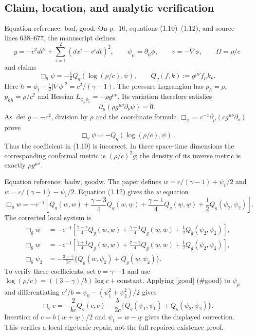 \documentclass[10pt]{article}
\begin{document}
\subsection*{Claim, location, and analytic verification}
Equation reference: bad, good. On p. 10, equations (1.10)–(1.12), and source lines 638–677, the manuscript defines \[g=-c^2dt^2+\sum_{i=1}^2(dx^i-v^idt)^2,\qquad
\psi_\mu=\partial_\mu\phi,\qquad v=-\nabla\phi,\qquad \Omega=\rho/c\] and claims \[
\Box_g\psi=-\tfrac12Q_g(\log(\rho/c),\psi),\qquad
Q_g(f,k):=g^{\mu\nu}f_\mu k_\nu .\] Here \(h=\phi_t-\frac12|\nabla\phi|^2=c^2/(\gamma-1)\). The pressure Lagrangian has \(p_h=\rho\), \(p_{hh}=\rho/c^2\) and Hessian \(L_{\phi_\mu\phi_\nu}=-\rho g^{\mu\nu}\). Its variation therefore satisfies \[\partial_\mu(\rho g^{\mu\nu}\partial_\nu\psi)=0.\] As \(\det g=-c^2\), division by \(\rho\) and the coordinate formula \(\Box_g=c^{-1}\partial_\mu(cg^{\mu\nu}\partial_\nu)\) prove \[
\Box_g\psi=-Q_g(\log(\rho/c),\psi).\] Thus the coefficient in (1.10) is incorrect. In three space-time dimensions the corresponding conformal metric is \((\rho/c)^2g\); the density of its inverse metric is exactly \(\rho g^{\mu\nu}\).\par
Equation reference: badw, goodw. The paper defines \(w=c/(\gamma-1)+\psi_1/2\) and \(\underline{w}=c/(\gamma-1)-\psi_1/2\). Equation (1.12) gives the \(w\) equation \[
\Box_g w=-c^{-1}\left[
Q_g(w,w)+\frac{\gamma-3}{4}Q_g(w,\underline{w})
+\frac{\gamma+1}{4}Q_g(\underline{w},\underline{w})+\frac12Q_g(\psi_2,\psi_2)\right].\] The corrected local system is \[\begin{aligned}
\Box_g w&=-c^{-1}\left[
\frac{7-\gamma}{4}Q_g(w,w)+\frac{\gamma+1}{4}Q_g(\underline{w},\underline{w})
+\frac12Q_g(\psi_2,\psi_2)\right],\\
\Box_g\underline{w}&=-c^{-1}\left[
\frac{\gamma+1}{4}Q_g(w,w)+\frac{7-\gamma}{4}Q_g(\underline{w},\underline{w})
+\frac12Q_g(\psi_2,\psi_2)\right],\\
\Box_g\psi_2&=-\frac{3-\gamma}{2c}
\{Q_g(w,\psi_2)+Q_g(\underline{w},\psi_2)\}.\end{aligned}\] To verify these coefficients, set \(b=\gamma-1\) and use \(\log(\rho/c)=((3-\gamma)/b)\log c+\mathrm{constant}\). Applying [good] (\#good) to \(\psi_\mu\) and differentiating \(c^2/b=\psi_0-(\psi_1^2+\psi_2^2)/2\) gives \[\Box_gc=-\frac{2}{bc}Q_g(c,c)
-\frac{b}{2c}\{Q_g(\psi_1,\psi_1)+Q_g(\psi_2,\psi_2)\}.\] Insertion of \(c=b(w+\underline{w})/2\) and \(\psi_1=w-\underline{w}\) gives the displayed correction. This verifies a local algebraic repair, not the full repaired existence proof.\par
\end{document}
